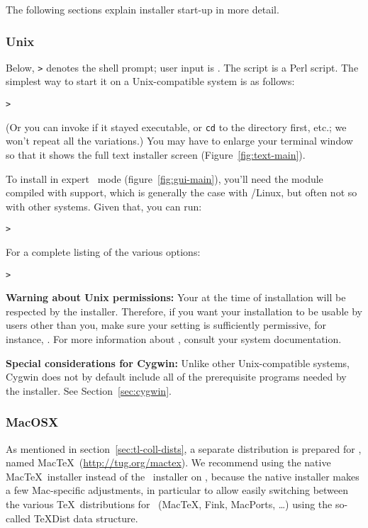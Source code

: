 \documentclass{article}
\begin{document}
\noindent
The following sections explain installer start-up in more detail.

\subsubsection{Unix}

Below, \texttt{>} denotes the shell prompt; user input is
.
The script  is a Perl script.  The simplest way
to start it on a Unix-compatible system is as follows:
\begin{alltt}
> 
\end{alltt}
(Or you can invoke  if it stayed
executable, or \texttt{cd} to the directory first, etc.; we won't repeat
all the variations.)  You may have to enlarge your terminal window so
that it shows the full text installer screen
(Figure~\ref{fig:text-main}).

To install in expert \GUI\ mode (figure~\ref{fig:gui-main}), you'll
need the  module compiled with  support,
which is generally the case with \GNU/Linux, but often not so with other
systems.  Given that, you can run:
\begin{alltt}
> 
\end{alltt}

For a complete listing of the various options:
\begin{alltt}
> 
\end{alltt}

\textbf{Warning about Unix permissions:} Your  at the time
of installation will be respected by the \TL{} installer.  Therefore, if
you want your installation to be usable by users other than you, make
sure your setting is sufficiently permissive, for instance, .  For more information about , consult your system
documentation.

\textbf{Special considerations for Cygwin:} Unlike other
Unix-compatible systems, Cygwin does not by default include all of the
prerequisite programs needed by the \TL{} installer.  See
Section~\ref{sec:cygwin}.


\subsubsection{MacOSX}
\label{sec:macosx}

As mentioned in section~\ref{sec:tl-coll-dists}, a separate distribution
is prepared for \MacOSX, named Mac\TeX\ (\url{http://tug.org/mactex}).
We recommend using the native Mac\TeX\ installer instead of the \TL\
installer on \MacOSX, because the native installer makes a few
Mac-specific adjustments, in particular to allow easily switching
between the various \TeX\ distributions for \MacOSX\ (Mac\TeX, Fink,
MacPorts, \ldots) using the so-called \TeX{}Dist data structure.
\end{document}
